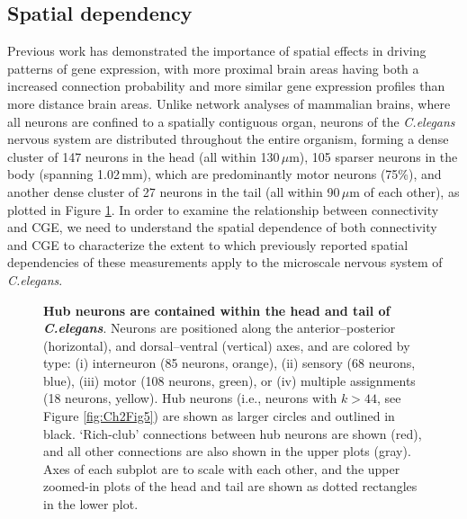 \subsection{Spatial dependency}
Previous work has demonstrated the importance of spatial effects in driving patterns of gene expression, with more proximal brain areas
\citep{Horvat2016,Wang2016,Markov2013,Henderson2014,Fulcher2016,Noori2017,Levy2012,Azulay2016} having both a increased connection probability and more similar gene expression profiles \citep{Krienen2016, Fulcher2016, Pantazatos2017, Richiardi2017} than more distance brain areas.
Unlike network analyses of mammalian brains, where all neurons are confined to a spatially contiguous organ, neurons of the \emph{C.elegans} nervous system are distributed throughout the entire organism, forming a dense cluster of 147 neurons in the head (all within 130\,$\mu$m), 105 sparser neurons in the body (spanning 1.02\,mm), which are predominantly motor neurons (75\%), and another dense cluster of 27 neurons in the tail (all within 90\,$\mu$m of each other), as plotted in Figure \ref{fig:Ch2Fig2}.
In order to examine the relationship between connectivity and CGE, we need to understand the spatial dependence of both connectivity and CGE to characterize the extent to which previously reported spatial dependencies of these measurements apply to the microscale nervous system of \emph{C.elegans}.

\begin{figure}[h]
\caption{\textbf{Hub neurons are contained within the head and tail of \emph{C.elegans}}.
Neurons are positioned along the anterior--posterior (horizontal), and dorsal--ventral (vertical) axes, and are colored by type:
(i) interneuron (85 neurons, orange),
(ii) sensory (68 neurons, blue),
(iii) motor (108 neurons, green), or
(iv) multiple assignments (18 neurons, yellow).
Hub neurons (i.e., neurons with $k > 44$, see Figure \ref{fig:Ch2Fig5}) are shown as larger circles and outlined in black.
`Rich-club' connections between hub neurons are shown (red), and all other connections are also shown in the upper plots (gray).
Axes of each subplot are to scale with each other, and the upper zoomed-in plots of the head and tail are shown as dotted rectangles in the lower plot.}
\label{fig:Ch2Fig2}
\end{figure}

